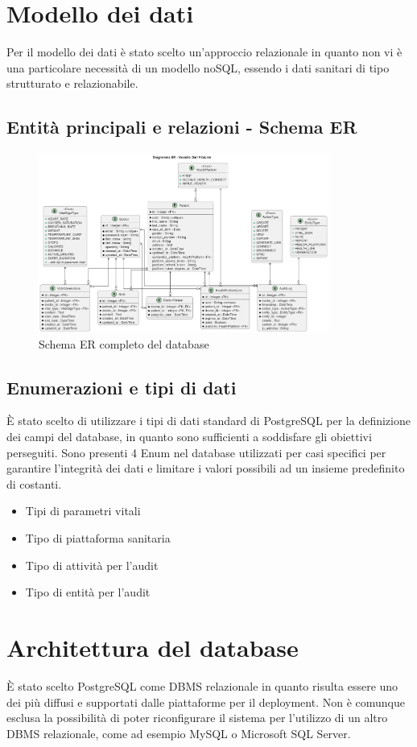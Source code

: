 \documentclass[12pt,a4paper,oneside]{report}
\begin{document}
\section{Modello dei dati}
Per il modello dei dati è stato scelto un'approccio relazionale in quanto non vi è una particolare necessità di un modello noSQL, essendo i dati sanitari di tipo strutturato e relazionabile.
\subsection{Entità principali e relazioni - Schema ER}
\begin{figure}[H]
    \centering
    \includegraphics[width=0.85\textwidth]{images/DataModel.png}
    \caption{Schema ER completo del database}
    \label{fig:Schema-ER}
\end{figure}
\subsection{Enumerazioni e tipi di dati}
È stato scelto di utilizzare i tipi di dati standard di PostgreSQL per la definizione dei campi del database, in quanto sono sufficienti a soddisfare gli obiettivi perseguiti.
Sono presenti 4 Enum nel database utilizzati per casi specifici per garantire l'integrità dei dati e limitare i valori possibili ad un insieme predefinito di costanti.
\begin{itemize}
    \item Tipi di parametri vitali
    \item Tipo di piattaforma sanitaria
    \item Tipo di attività per l'audit
    \item Tipo di entità per l'audit
\end{itemize}
\section{Architettura del database}
È stato scelto PostgreSQL come DBMS relazionale in quanto risulta essere uno dei più diffusi e supportati dalle piattaforme per il deployment.
Non è comunque esclusa la possibilità di poter riconfigurare il sistema per l'utilizzo di un altro DBMS relazionale, come ad esempio MySQL o Microsoft SQL Server.
\end{document}
